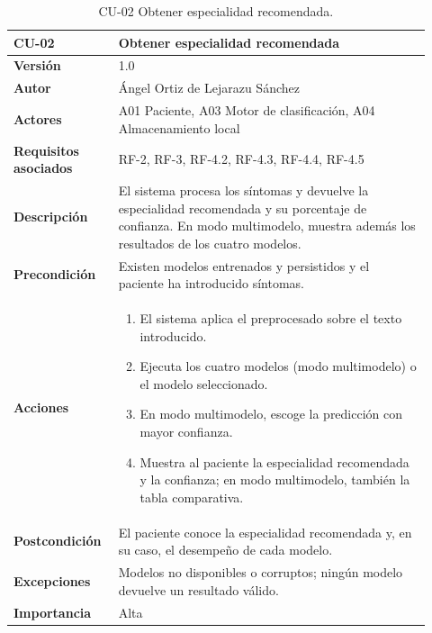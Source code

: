 \begin{table}[H]
	\centering
	\begin{tabular}{ p{0.21\linewidth} p{0.71\linewidth} }
		\toprule
		\textbf{CU-02}    & \textbf{Obtener especialidad recomendada}\\
		\toprule
		\textbf{Versión}              & 1.0 \\
		\textbf{Autor}                & Ángel Ortiz de Lejarazu Sánchez \\
		\textbf{Actores}              & A01 Paciente, A03 Motor de clasificación, A04 Almacenamiento local \\
		\textbf{Requisitos asociados} & RF-2, RF-3, RF-4.2, RF-4.3, RF-4.4, RF-4.5 \\
		\textbf{Descripción}          & El sistema procesa los síntomas y devuelve la especialidad recomendada y su porcentaje de confianza. En modo multimodelo, muestra además los resultados de los cuatro modelos. \\
		\textbf{Precondición}         & Existen modelos entrenados y persistidos y el paciente ha introducido síntomas. \\
		\textbf{Acciones}             &
		\begin{enumerate}
			\def\labelenumi{\arabic{enumi}.}
			\item El sistema aplica el preprocesado sobre el texto introducido.
			\item Ejecuta los cuatro modelos (modo multimodelo) o el modelo seleccionado.
			\item En modo multimodelo, escoge la predicción con mayor confianza.
			\item Muestra al paciente la especialidad recomendada y la confianza; en modo multimodelo, también la tabla comparativa.
		\end{enumerate} \\
		\textbf{Postcondición}        & El paciente conoce la especialidad recomendada y, en su caso, el desempeño de cada modelo. \\
		\textbf{Excepciones}          & Modelos no disponibles o corruptos; ningún modelo devuelve un resultado válido. \\
		\textbf{Importancia}          & Alta \\
		\bottomrule
	\end{tabular}
	\caption{CU-02 Obtener especialidad recomendada.}
\end{table}

